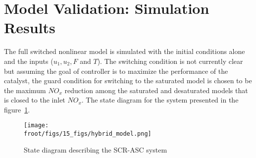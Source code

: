 \newpage
\section{Model Validation: Simulation Results}

The full switched nonlinear model is simulated with the initial conditions alone and the inputs ($u_1, u_2, F$ and $T$). The switching condition is not currently clear but assuming the goal of controller is to maximize the performance of the catalyst, the guard condition for switching to the saturated model is chosen to be the maximum $NO_x$ reduction among the saturated and desaturated models that is closed to the inlet $NO_x$. The state diagram for the system presented in the figure~\ref{fig::hybrid_automata}.

\begin{figure}[H]
        \centering
        \texttt{[image: \\froot/figs/15\_figs/hybrid\_model.png]}
        \caption{State diagram describing the SCR-ASC system}
        \label{fig::hybrid_automata}
\end{figure}

